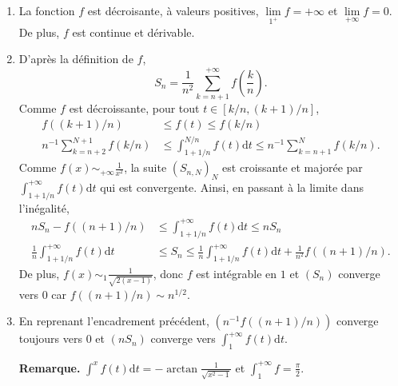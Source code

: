 \begin{elemsolution}
\begin{enumerate}
\item La fonction $f$ est décroisante, à valeurs positives, $\lim\limits_{1^+} f = +\infty$ et $\lim\limits_{+\infty} f = 0$. De plus, $f$ est continue et dérivable.

\item D'après la définition de $f$,
\[
S_n = \frac{1}{n^2} \sum\limits_{k=n+1}^{+\infty} f\mathopen{}\left(\frac{k}{n}\right).
\]
Comme $f$ est décroissante, pour tout $t \in [k/n,(k+1)/n]$,
\begin{align*}
f((k+1)/n) &\leq f(t) \leq f(k/n) \\
n^{-1} \sum\limits_{k=n+2}^{N+1} f(k/n) &\leq \displaystyle\int_{1+1/n}^{N/n} f(t) \mathrm{d}t \leq n^{-1} \sum\limits_{k=n+1}^{N} f(k/n).
\end{align*}
Comme $f(x) \sim_{+\infty} \frac{1}{x^2}$, la suite $(S_{n,N})_N$ est croissante et majorée par $\displaystyle\int_{1+1/n}^{+\infty} f(t) \mathrm{d}t$ qui est convergente. Ainsi, en passant à la limite dans l'inégalité,
\begin{align*}
n S_n - f((n+1)/n) &\leq \displaystyle\int_{1+1/n}^{+\infty} f(t) \mathrm{d}t \leq n S_n \\
\frac{1}{n} \displaystyle\int_{1+1/n}^{+\infty} f(t) \mathrm{d}t &\leq S_n \leq \frac{1}{n} \displaystyle\int_{1+1/n}^{+\infty} f(t) \mathrm{d}t + \frac{1}{n^2} f((n+1)/n).
\end{align*}
De plus, $f(x) \sim_1 \frac{1}{\sqrt{2 (x - 1)}}$, donc $f$ est intégrable en $1$ et $(S_n)$ converge vers $0$ car $f((n+1)/n) \sim n^{1/2}$.

\item En reprenant l'encadrement précédent, $\left(n^{-1} f((n+1)/n)\right)$ converge toujours vers $0$ et $(n S_n)$ converge vers $\displaystyle\int_1^{+\infty} f(t) \mathrm{d}t$.

\textbf{Remarque.} $\displaystyle\int^x f(t) \mathrm{d}t = - \arctan\frac{1}{\sqrt{x^2 - 1}}$ et $\displaystyle\int_1^{+\infty} f = \frac{\pi}{2}$.
\end{enumerate}
\end{elemsolution}